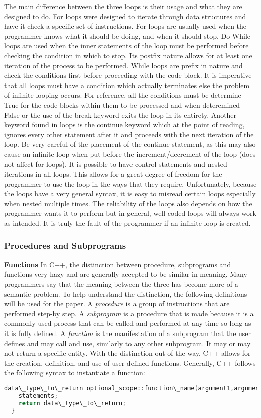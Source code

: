 \documentclass[12pt]{article}
\begin{document}
The main difference between the three loops is their usage and what they are designed to do. For loops were designed to iterate through data structures and have it check a specific set of instructions. For-loops are usually used when the programmer knows what it should be doing, and when it should stop. Do-While loops are used when the inner statements of the loop must be performed before checking the condition in which to stop. Its postfix nature allows for at least one iteration of the process to be performed. While loops are prefix in nature and check the conditions first before proceeding with the code block. It is imperative that all loops must have a condition which actually terminates else the problem of infinite looping occurs. For reference, all the conditions must be determine True for the code blocks within them to be processed and when deteremined False or the use of the break keyword exits the loop in its entirety. Another keyword found in loops is the continue keyword which at the point of reading, ignores every other statement after it and proceeds with the next iteration of the loop. Be very careful of the placement of the continue statement, as this may also cause an infinite loop when put before the increment/decrement of the loop (does not affect for-loops). It is possible to have control statements and nested iterations in all loops. This allows for a great degree of freedom for the programmer to use the loop in the ways that they require. Unfortunately, because the loops have a very general syntax, it is easy to misread certain loops especially when nested multiple times. The reliability of the loops also depends on how the programmer wants it to perform but in general, well-coded loops will always work as intended. It is truly the fault of the programmer if an infinite loop is created.

\subsubsection{Procedures and Subprograms}
\textbf{Functions} In C++, the distinction between procedure, subprograms and functions very hazy and are generally accepted to be similar in meaning. Many programmers say that the meaning between the three has become more of a semantic problem. To help understand the distinction, the following definitions will be used for the paper. A \textit{procedure} is a group of instructions that are performed step-by step. A \textit{subprogram} is a procedure that is made because it is a commonly used process that can be called and performed at any time so long as it is fully defined. A \textit{function} is the manifestation of a subprogram that the user defines and may call and use, similarly to any other subprogram. It may or may not return a specific entity. With the distinction out of the way, C++ allows for the creation, definition, and use of user-defined functions. Generally, C++ follows the following syntax to instantiate a function:
\begin{lstlisting}[language=C++]
  data\_type\_to\_return optional_scope::function\_name(argument1,argument2,...,argumentn){
    statements;
    return data\_type\_to\_return;
  }
\end{lstlisting}
\end{document}
